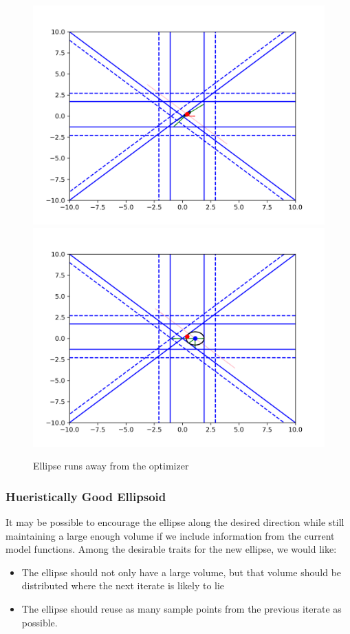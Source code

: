 \documentclass{article}
\theoremstyle{case}
\begin{document}
\begin{figure}[h]
    \centering
    \includegraphics[scale=0.4]{images/run_away_1.png}
    \includegraphics[scale=0.4]{images/run_away_2.png}
    \caption{Ellipse runs away from the optimizer}
    \label{line_can_run}
\end{figure}


\subsubsection{Hueristically Good Ellipsoid}

It may be possible to encourage the ellipse along the desired direction while still maintaining a large enough volume if we include information from the current model functions.
Among the desirable traits for the new ellipse, we would like:
\begin{itemize}
    \item The ellipse should not only have a large volume, but that volume should be distributed where the next iterate is likely to lie
    \item The ellipse should reuse as many sample points from the previous iterate as possible.
\end{itemize}
\end{document}
